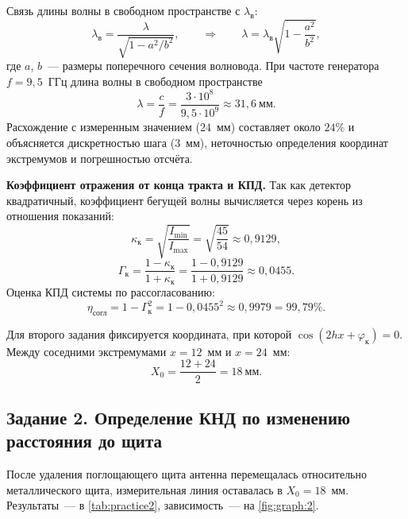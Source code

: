 Связь длины волны в свободном пространстве с $\lambda_{\text{в}}$:
\begin{equation}
	\lambda_{\text{в}} = \frac{\lambda}{\sqrt{1 - a^2/b^2}},
	\qquad\Longrightarrow\qquad
	\lambda = \lambda_{\text{в}} \sqrt{1 - \frac{a^2}{b^2}},
\end{equation}
где $a$, $b$~--- размеры поперечного сечения волновода. При частоте генератора $f = 9{,}5$~ГГц длина волны в свободном пространстве
\begin{equation}
	\lambda = \frac{c}{f}
	= \frac{3 \cdot 10^8}{9{,}5 \cdot 10^9}
	\approx 31{,}6~\text{мм}.
\end{equation}
Расхождение с измеренным значением ($24$~мм) составляет около $24\%$ и объясняется дискретностью шага ($3$~мм), неточностью определения координат экстремумов и погрешностью отсчёта.

\noindent\textbf{Коэффициент отражения от конца тракта и КПД.}
Так как детектор квадратичный, коэффициент бегущей волны вычисляется через корень из отношения показаний:
\begin{equation}
	\kappa_{\text{к}} = \sqrt{\frac{I_{\min}}{I_{\max}}}
	= \sqrt{\frac{45}{54}}
	\approx 0{,}9129,
\end{equation}
\begin{equation}
	\Gamma_{\text{к}} = \frac{1 - \kappa_{\text{к}}}{1 + \kappa_{\text{к}}}
	= \frac{1 - 0{,}9129}{1 + 0{,}9129}
	\approx 0{,}0455.
\end{equation}
Оценка КПД системы по рассогласованию:
\begin{equation}
	\eta_{\text{согл}} = 1 - \Gamma_{\text{к}}^2
	= 1 - 0{,}0455^2
	\approx 0{,}9979 = 99{,}79\%.
\end{equation}

Для второго задания фиксируется координата, при которой $\cos(2hx + \varphi_{\text{к}}) = 0$. Между соседними экстремумами $x = 12$~мм и $x = 24$~мм:
\begin{equation}
	X_0 = \frac{12 + 24}{2} = 18~\text{мм}.
\end{equation}

\subsection{Задание 2. Определение КНД по изменению расстояния до щита}

После удаления поглощающего щита антенна перемещалась относительно металлического щита, измерительная линия оставалась в $X_0 = 18$~мм. Результаты~--- в \cref{tab:practice2}, зависимость~--- на \cref{fig:graph:2}.

